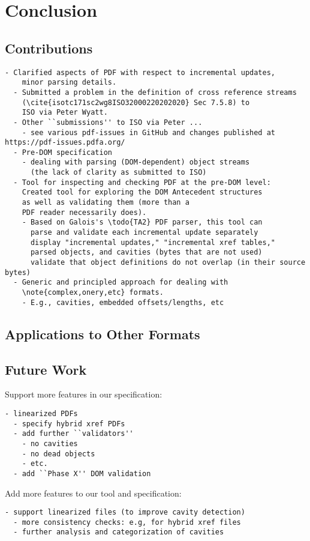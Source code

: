 \section{Conclusion }
\label{sec:conclusion}

\subsection{Contributions}

\begin{lstlisting}[style=meta]
  - Clarified aspects of PDF with respect to incremental updates,
    minor parsing details.
  - Submitted a problem in the definition of cross reference streams
    (\cite{isotc171sc2wg8ISO32000220202020} Sec 7.5.8) to
    ISO via Peter Wyatt.
  - Other ``submissions'' to ISO via Peter ...
    - see various pdf-issues in GitHub and changes published at https://pdf-issues.pdfa.org/
  - Pre-DOM specification
    - dealing with parsing (DOM-dependent) object streams
      (the lack of clarity as submitted to ISO)
  - Tool for inspecting and checking PDF at the pre-DOM level:
    Created tool for exploring the DOM Antecedent structures
    as well as validating them (more than a
    PDF reader necessarily does).
    - Based on Galois's \todo{TA2} PDF parser, this tool can
      parse and validate each incremental update separately
      display "incremental updates," "incremental xref tables,"
      parsed objects, and cavities (bytes that are not used)
      validate that object definitions do not overlap (in their source bytes)
  - Generic and principled approach for dealing with
    \note{complex,onery,etc} formats.
    - E.g., cavities, embedded offsets/lengths, etc
\end{lstlisting}

\subsection{Applications to Other Formats}


\subsection{Future Work}

Support more features in our specification:
\begin{lstlisting}[style=meta]
  - linearized PDFs
  - specify hybrid xref PDFs
  - add further ``validators''
    - no cavities
    - no dead objects
    - etc.
  - add ``Phase X'' DOM validation
\end{lstlisting}

Add more features to our tool and specification:
\begin{lstlisting}[style=meta]
  - support linearized files (to improve cavity detection)
  - more consistency checks: e.g, for hybrid xref files
  - further analysis and categorization of cavities
\end{lstlisting}

